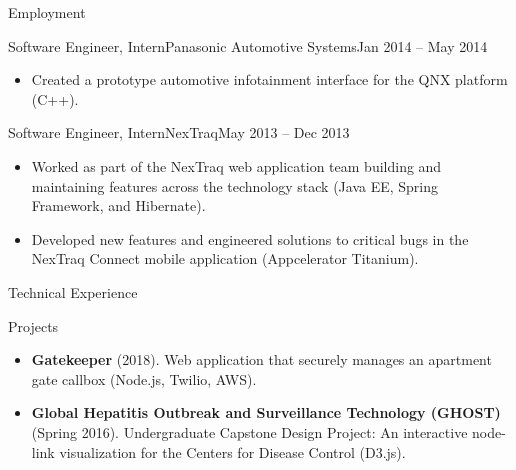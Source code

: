 \documentclass[]{mcdowellcv}
\begin{document}
\begin{cvsection}{Employment}
		\begin{cvsubsection}{Software Engineer, Intern}{Panasonic Automotive Systems}{Jan 2014 -- May 2014}
			\begin{itemize}
				\item Created a prototype automotive infotainment interface for the QNX platform (C++).
			\end{itemize}
		\end{cvsubsection}

		\begin{cvsubsection}{Software Engineer, Intern}{NexTraq}{May 2013 -- Dec 2013}
			\begin{itemize}
				\item Worked as part of the NexTraq web application team building and maintaining features across the technology stack (Java EE, Spring Framework, and Hibernate).
				\item Developed new features and engineered solutions to critical bugs in the NexTraq Connect mobile application (Appcelerator Titanium).
			\end{itemize}
		\end{cvsubsection}
	\end{cvsection}
	
	\begin{cvsection}{Technical Experience}
		\begin{cvsubsection}{Projects}{}{}
			\begin{itemize}
				\item \textbf{Gatekeeper} (2018). Web application that securely manages an apartment gate callbox (Node.js, Twilio, AWS).
				\item \textbf{Global Hepatitis Outbreak and Surveillance Technology (GHOST)} (Spring 2016). Undergraduate Capstone Design Project: An interactive node-link visualization for the Centers for Disease Control (D3.js).
			\end{itemize}
		\end{cvsubsection}
	\end{cvsection}
	
\end{document}
